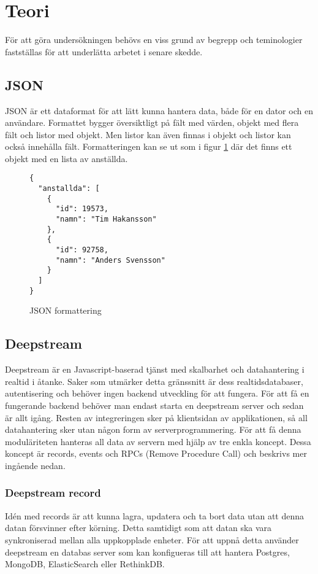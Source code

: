 \section{Teori}

\label{sec:tim-theory}
För att göra undersökningen behövs en viss grund av begrepp och teminologier fastställas för att underlätta arbetet i senare skedde.

\subsection{JSON}
JSON\cite{json} är ett dataformat för att lätt kunna hantera data, både för en dator och en användare. Formattet bygger översiktligt på fält med värden, objekt med flera fält och listor med objekt. Men listor kan även finnas i objekt och listor kan också innehålla fält. Formatteringen kan se ut som i figur \ref{fig:jsonformat} där det finns ett objekt med en lista av anställda.

\lstset{language=Java}
\begin{figure}[h]
  \begin{minipage}[c]{5cm}
    \begin{lstlisting}
{
  "anstallda": [   
    {
      "id": 19573,
      "namn": "Tim Hakansson"
    },
    {
      "id": 92758,
      "namn": "Anders Svensson"
    }
  ]
}
    \end{lstlisting}
  \caption{JSON formattering}
  \label{fig:jsonformat}
  \end{minipage}
\end{figure}

\subsection{Deepstream}
\label{subsec:tim-deepstream}
Deepstream är en Javascript-baserad tjänst med skalbarhet och datahantering i realtid i åtanke. Saker som utmärker detta gränssnitt är dess realtidsdatabaser, autentisering och behöver ingen backend utveckling för att fungera. För att få en fungerande backend behöver man endast starta en deepstream server och sedan är allt igång. Resten av integreringen sker på klientsidan av applikationen, så all datahantering sker utan någon form av serverprogrammering. För att få denna moduläriteten hanteras all data av servern med hjälp av tre enkla koncept. Dessa koncept är records, events och RPCs (Remove Procedure Call) och beskrivs mer ingående nedan. 

\subsubsection{Deepstream record}
Idén med records är att kunna lagra, updatera och ta bort data utan att denna datan försvinner efter körning. Detta samtidigt som att datan ska vara synkroniserad mellan alla uppkopplade enheter. För att uppnå detta använder deepstream en databas server som kan konfigueras till att hantera Postgres, MongoDB, ElasticSearch eller RethinkDB. 

